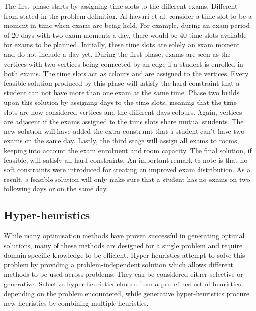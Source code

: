 The first phase starts by assigning time slots to the different exams. Different from stated in the problem definition, Al-hawari et al. consider a time slot to be a moment in time when exams are being held. For example, during an exam period of 20 days with two exam moments a day, there would be 40 time slots available for exams to be planned. Initially, these time slots are solely an exam moment and do not include a day yet. During the first phase, exams are seen as the vertices with two vertices being connected by an edge if a student is enrolled in both exams. The time slots act as colours and are assigned to the vertices. Every feasible solution produced by this phase will satisfy the hard constraint that a student can not have more than one exam at the same time. Phase two builds upon this solution by assigning days to the time slots, meaning that the time slots are now considered vertices and the different days colours. Again, vertices are adjacent if the exams assigned to the time slots share mutual students. The new solution will have added the extra constraint that a student can't have two exams on the same day. Lastly, the third stage will assign all exams to rooms, keeping into account the exam enrolment and room capacity. The final solution, if feasible, will satisfy all hard constraints. An important remark to note is that no soft constraints were introduced for creating an improved exam distribution. As a result, a feasible solution will only make sure that a student has no exams on two following days or on the same day.


\subsection{Hyper-heuristics}

While many optimisation methods have proven successful in generating optimal solutions, many of these methods are designed for a single problem and require domain-specific knowledge to be efficient. Hyper-heuristics attempt to solve this problem by providing a problem-independent solution which allows different methods to be used across problems. They can be considered either selective or generative. Selective hyper-heuristics choose from a predefined set of heuristics depending on the problem encountered, while generative hyper-heuristics procure new heuristics by combining multiple heuristics.

